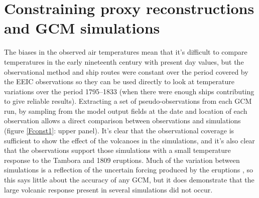 \documentclass[CP]{copernicus}
\begin{document}
\section{Constraining proxy reconstructions and GCM simulations}

The biases in the observed air temperatures mean that it's difficult to compare temperatures in the early nineteenth century with present day values, but the observational method and ship routes were constant over the period covered by the EEIC observations so they can be used directly to look at temperature variations over the period 1795--1833 (when there were enough ships contributing to give reliable results). Extracting a set of pseudo-observations from each GCM run, by sampling from the model output fields at the date and location of each observation allows a direct comparison between observations and simulations (figure \ref{Fconst1}: upper panel). It's clear that the observational coverage is sufficient to show the effect of the volcanoes in the simulations, and it's also clear that the observations support those simulations with a small temperature response to the Tambora and 1809 eruptions. Much of the variation between simulations is a reflection of the uncertain forcing produced by the eruptions \citep{wagner05dalton,schmidt11forcing}, so this says little about the accuracy of any GCM, but it does demonstrate that the large volcanic response present in several simulations did not occur. 
\end{document}
